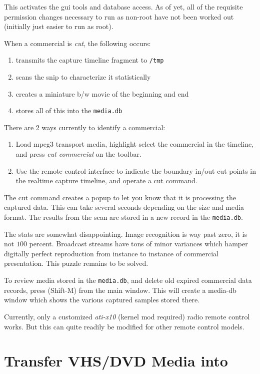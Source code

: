 This activates the gui tools and database access.  As of yet, all of the requisite permission changes
necessary to run as non-root have not been worked out (initially just easier to run as root).

When a commercial is \textit{cut}, the following occurs:

\begin{enumerate}
    \item transmits the capture timeline fragment to \texttt{/tmp}
    \item scans the snip to characterize it statistically
    \item creates a miniature b/w movie of the beginning and end
    \item stores all of this into the \texttt{media.db}
\end{enumerate}

There are 2 ways currently to identify a commercial:

\begin{enumerate}
    \item Load mpeg3 transport media, highlight select the commercial in the  timeline, and press \textit{cut commercial} on the toolbar.
    \item Use the remote control interface to indicate the boundary in/out cut points in the realtime capture timeline, and operate a cut command.    
\end{enumerate}

The cut command creates a popup to let you know that it is processing the captured data.  This can take several seconds depending on the size and media format.  The results from the scan are stored in a new record in the \texttt{media.db}.

The stats are somewhat disappointing.  Image recognition is way past zero, it is not $100$ percent. Broadcast streams have tons of minor variances which hamper digitally perfect reproduction from instance to instance of commercial presentation.  This puzzle remains to be solved.

To review media stored in the \texttt{media.db}, and delete old expired commercial data records, press (Shift-M) from the main window.  This will create a media-db window which shows the various captured samples stored there.

Currently, only a customized \textit{ati-x10} (kernel mod required) radio remote control works.  But this can quite readily be modified for other remote control models.

\section{Transfer VHS/DVD Media into \CGG{}}%
\label{sec:transfer_vhs_dvd_into_cinelerra}

